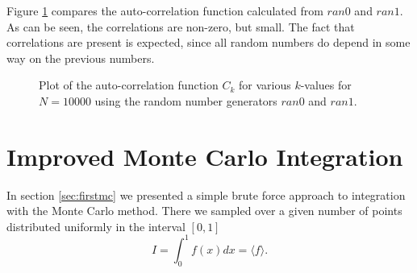 Figure \ref{fig:rnauto} compares the auto-correlation function calculated from $ran0$ and
$ran1$. As can be seen, the correlations are non-zero, but small.
The fact that correlations are present is expected, since all random numbers
do depend in some way on the previous numbers.
\begin{figure}\label{fig:autocor}
\begin{center}

\end{center}
\caption{Plot of the auto-correlation function $C_k$ for various
$k$-values for $N=10000$ using the random number generators $ran0$ and
$ran1$.\label{fig:rnauto}} 
\end{figure}






\section{Improved Monte Carlo Integration}
\label{sec:mcintegration}
In section \ref{sec:firstmc}  we presented a simple brute force approach 
to integration with the Monte Carlo method. There we sampled
over a given number of points distributed uniformly in the interval
$[0,1]$
\[
   I=\int_0^1 f(x)dx=\langle f\rangle.
\]

